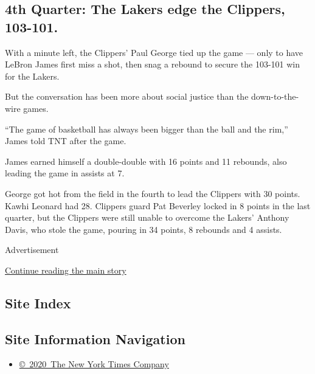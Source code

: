 \hypertarget{4th-quarter-the-lakers-edge-the-clippers-103-101}{%
\subsection{4th Quarter: The Lakers edge the Clippers,
103-101.}\label{4th-quarter-the-lakers-edge-the-clippers-103-101}}

With a minute left, the Clippers' Paul George tied up the game --- only
to have LeBron James first miss a shot, then snag a rebound to secure
the 103-101 win for the Lakers.

But the conversation has been more about social justice than the
down-to-the-wire games.

``The game of basketball has always been bigger than the ball and the
rim,'' James told TNT after the game.

James earned himself a double-double with 16 points and 11 rebounds,
also leading the game in assists at 7.

George got hot from the field in the fourth to lead the Clippers with 30
points. Kawhi Leonard had 28. Clippers guard Pat Beverley locked in 8
points in the last quarter, but the Clippers were still unable to
overcome the Lakers' Anthony Davis, who stole the game, pouring in 34
points, 8 rebounds and 4 assists.

Advertisement

\protect\hyperlink{after-bottom}{Continue reading the main story}

\hypertarget{site-index}{%
\subsection{Site Index}\label{site-index}}

\hypertarget{site-information-navigation}{%
\subsection{Site Information
Navigation}\label{site-information-navigation}}

\begin{itemize}
\tightlist
\item
  \href{https://help.nytimes.com/hc/en-us/articles/115014792127-Copyright-notice}{©~2020~The
  New York Times Company}
\end{itemize}

